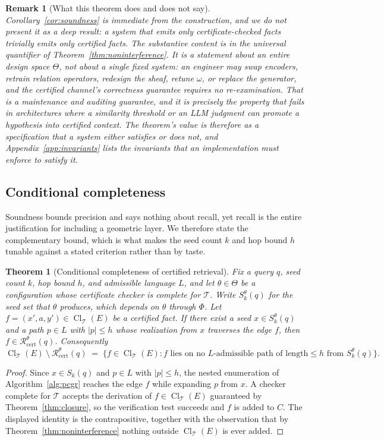\documentclass[11pt]{article}
\newtheorem{theorem}[definition]{Theorem}
\newtheorem{remark}[definition]{Remark}
\newcommand{\Cl}{\operatorname{Cl}}
\newcommand{\T}{\mathcal{T}}
\begin{document}
\begin{remark}[What this theorem does and does not say]
\label{rem:not-vacuous}
Corollary~\ref{cor:soundness} is immediate from the construction, and we do not present it as a deep result: a system that emits only certificate-checked facts trivially emits only certified facts. The substantive content is in the universal quantifier of Theorem~\ref{thm:noninterference}. It is a statement about an entire design space $\Theta$, not about a single fixed system: an engineer may swap encoders, retrain relation operators, redesign the sheaf, retune $\omega$, or replace the generator, and the certified channel's correctness guarantee requires no re-examination. That is a maintenance and auditing guarantee, and it is precisely the property that fails in architectures where a similarity threshold or an LLM judgment can promote a hypothesis into certified context. The theorem's value is therefore as a specification that a system either satisfies or does not, and Appendix~\ref{app:invariants} lists the invariants that an implementation must enforce to satisfy it.
\end{remark}

\subsection{Conditional completeness}

Soundness bounds precision and says nothing about recall, yet recall is the entire justification for including a geometric layer. We therefore state the complementary bound, which is what makes the seed count $k$ and hop bound $h$ tunable against a stated criterion rather than by taste.

\begin{theorem}[Conditional completeness of certified retrieval]
\label{thm:completeness}
Fix a query $q$, seed count $k$, hop bound $h$, and admissible language $L$, and let $\theta\in\Theta$ be a configuration whose certificate checker is complete for $\T$. Write $S_k^{\theta}(q)$ for the seed set that $\theta$ produces, which depends on $\theta$ through $\Phi$. Let $f=(x',a,y')\in\Cl_{\T}(E)$ be a certified fact. If there exist a seed $x\in S_k^{\theta}(q)$ and a path $p\in L$ with $|p|\le h$ whose realization from $x$ traverses the edge $f$, then $f\in\mathcal{R}^{\theta}_{\mathrm{cert}}(q)$. Consequently
\[
\Cl_{\T}(E)\ \setminus\ \mathcal{R}^{\theta}_{\mathrm{cert}}(q)
\;=\;
\{f\in\Cl_{\T}(E): f\text{ lies on no }L\text{-admissible path of length}\le h\text{ from }S_k^{\theta}(q)\}.
\]
\end{theorem}
\begin{proof}
Since $x\in S_k(q)$ and $p\in L$ with $|p|\le h$, the nested enumeration of Algorithm~\ref{alg:pcgr} reaches the edge $f$ while expanding $p$ from $x$. A checker complete for $\T$ accepts the derivation of $f\in\Cl_{\T}(E)$ guaranteed by Theorem~\ref{thm:closure}, so the verification test succeeds and $f$ is added to $C$. The displayed identity is the contrapositive, together with the observation that by Theorem~\ref{thm:noninterference} nothing outside $\Cl_{\T}(E)$ is ever added.
\end{proof}
\end{document}
